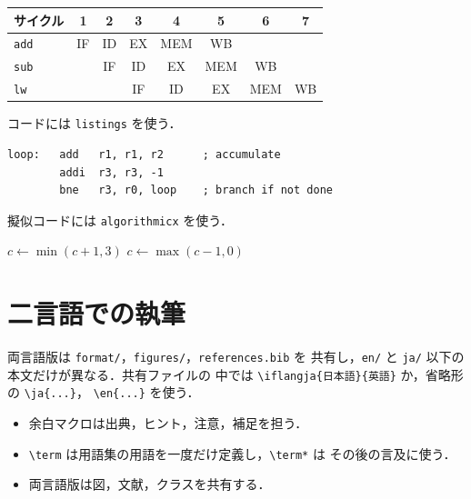 \documentclass[../main.tex]{subfiles}
\begin{document}
\begin{widefigure}[htbp]
  \begin{tabular}{@{}lccccccc@{}}
    \toprule
    サイクル & 1 & 2 & 3 & 4 & 5 & 6 & 7 \\
    \midrule
    \texttt{add}  & IF & ID & EX & MEM & WB &    &    \\
    \texttt{sub}  &    & IF & ID & EX  & MEM & WB &   \\
    \texttt{lw}   &    &    & IF & ID  & EX  & MEM & WB \\
    \bottomrule
  \end{tabular}
  \caption{本文と余白にまたがる幅広フロート（\texttt{widefigure}）．}
  \label{fig:l01-wide}
\end{widefigure}

コードには \verb|listings| を使う．
\begin{lstlisting}[language={[x86masm]Assembler}, caption={アセンブリのループ．}]
loop:   add   r1, r1, r2      ; accumulate
        addi  r3, r3, -1
        bne   r3, r0, loop    ; branch if not done
\end{lstlisting}

擬似コードには \verb|algorithmicx| を使う．
\begin{algorithm}[htbp]
  \caption{2ビット飽和カウンタの更新}
  \begin{algorithmic}[1]
      \State $c \gets \min(c+1, 3)$
    \Else
      \State $c \gets \max(c-1, 0)$
    \EndIf
  \end{algorithmic}
\end{algorithm}

\section{二言語での執筆}

両言語版は \texttt{format/}，\texttt{figures/}，\texttt{references.bib} を
共有し，\texttt{en/} と \texttt{ja/} 以下の本文だけが異なる．共有ファイルの
中では \verb|\iflangja{日本語}{英語}| か，省略形の \verb|\ja{...}|，
\verb|\en{...}| を使う．

\begin{keypoint}[章のまとめ]
  \begin{itemize}
    \item 余白マクロは出典，ヒント，注意，補足を担う．
    \item \verb|\term| は用語集の用語を一度だけ定義し，\verb|\term*| は
      その後の言及に使う．
    \item 両言語版は図，文献，クラスを共有する．
  \end{itemize}
\end{keypoint}
\end{document}

